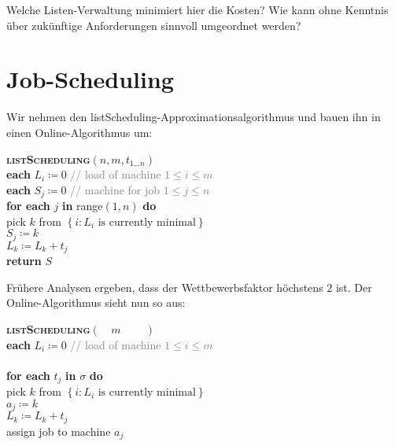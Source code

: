 Welche Listen-Verwaltung minimiert hier die Kosten? Wie kann ohne Kenntnis über zukünftige Anforderungen sinnvoll umgeordnet werden?

\section{Job-Scheduling}

Wir nehmen den listScheduling-Approximationsalgorithmus und bauen ihn in einen Online-Algorithmus um:

\begin{pseudocode}
  \textbf{\textsc{listScheduling}}\( (n,m,t_{1\dots n}) \) \\
  \textbf{each} \( L_i \coloneqq 0 \) \quad \textcolor{gray}{// load of machine \( 1 \leq i \leq m \)} \\
  \textbf{each} \( S_j \coloneqq 0 \) \quad \textcolor{gray}{// machine for job \( 1 \leq j \leq n \)} \\
  \textbf{for each} \( j \) \textbf{in} range\( (1,n) \) \textbf{do} \\
  \phantom{\enskip} pick \( k \) from \( \left \{ i : L_i \text{ is currently minimal} \right \} \) \\
  \phantom{\enskip} \( S_j \coloneqq k \) \\
  \phantom{\enskip} \( L_k \coloneqq L_k + t_j \) \\
  \textbf{return} \( S \)
\end{pseudocode}

Frühere Analysen ergeben, dass der Wettbewerbsfaktor höchstens \( 2 \) ist. Der Online-Algorithmus sieht nun so aus:

\begin{pseudocode}
  \textbf{\textsc{listScheduling}}\( (\phantom{n,}m\phantom{,t_{1\dots n}}) \) \\
  \textbf{each} \( L_i \coloneqq 0 \) \quad \textcolor{gray}{// load of machine \( 1 \leq i \leq m \)} \\
   \\
  \textbf{for each} \( t_j \) \textbf{in} \( \sigma \) \textbf{do} \\
  \phantom{\enskip} pick \( k \) from \( \left \{ i : L_i \text{ is currently minimal} \right \} \) \\
  \phantom{\enskip} \( a_j \coloneqq k \) \\
  \phantom{\enskip} \( L_k \coloneqq L_k + t_j \) \\
  \phantom{\enskip} assign job to machine \( a_j \)
\end{pseudocode}

